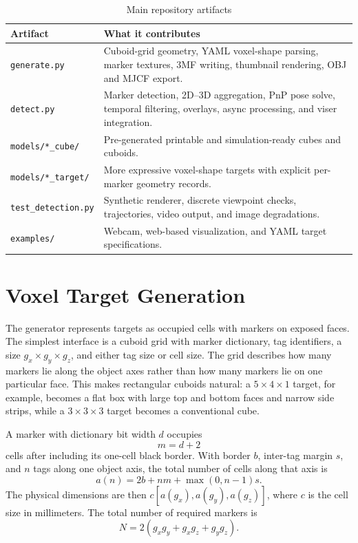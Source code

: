 \documentclass[conference]{IEEEtran}
\begin{document}
\begin{table}[t]
\caption{Main repository artifacts}
\label{tab:artifacts}
\centering
\begingroup
\footnotesize
\renewcommand{\arraystretch}{1.18}
\setlength{\tabcolsep}{4pt}
\begin{tabular}{@{}L{0.34\columnwidth}L{0.57\columnwidth}@{}}
\textbf{Artifact} & \textbf{What it contributes} \\
\hline
\texttt{generate.py} & Cuboid-grid geometry, YAML voxel-shape parsing, marker textures, 3MF writing, thumbnail rendering, OBJ and MJCF export. \\
\texttt{detect.py} & Marker detection, 2D--3D aggregation, PnP pose solve, temporal filtering, overlays, async processing, and viser integration. \\
\texttt{models/*\_cube/} & Pre-generated printable and simulation-ready cubes and cuboids. \\
\texttt{models/*\_target/} & More expressive voxel-shape targets with explicit per-marker geometry records. \\
\texttt{test\_detection.py} & Synthetic renderer, discrete viewpoint checks, trajectories, video output, and image degradations. \\
\texttt{examples/} & Webcam, web-based visualization, and YAML target specifications. \\
\hline
\end{tabular}
\endgroup
\end{table}

\section{Voxel Target Generation}
The generator represents targets as occupied cells with markers on exposed faces. The simplest interface is a cuboid grid with marker dictionary, tag identifiers, a size \(g_x \times g_y \times g_z\), and either tag size or cell size. The grid describes how many markers lie along the object axes rather than how many markers lie on one particular face. This makes rectangular cuboids natural: a \(5\times4\times1\) target, for example, becomes a flat box with large top and bottom faces and narrow side strips, while a \(3\times3\times3\) target becomes a conventional cube.

A marker with dictionary bit width \(d\) occupies
\begin{equation}
m = d + 2
\end{equation}
cells after including its one-cell black border. With border \(b\), inter-tag margin \(s\), and \(n\) tags along one object axis, the total number of cells along that axis is
\begin{equation}
a(n)=2b+nm+\max(0,n-1)s.
\end{equation}
The physical dimensions are then \(c[a(g_x),a(g_y),a(g_z)]\), where \(c\) is the cell size in millimeters. The total number of required markers is
\begin{equation}
N=2(g_xg_y+g_xg_z+g_yg_z).
\end{equation}
\end{document}

